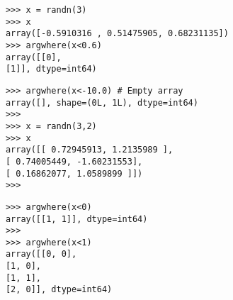 \documentclass[KSmainSlides.tex]{subfiles}
\begin{document}
				\begin{frame}[fragile]
		\begin{framed}
			\begin{verbatim}
			>>> x = randn(3)
			>>> x
			array([-0.5910316 , 0.51475905, 0.68231135])
			>>> argwhere(x<0.6)
			array([[0],
			[1]], dtype=int64)
					\end{verbatim}
				\end{framed}
			\end{frame}
				\begin{frame}[fragile]
			\begin{framed}
				\begin{verbatim}
			>>> argwhere(x<-10.0) # Empty array
			array([], shape=(0L, 1L), dtype=int64)
			>>>
			>>> x = randn(3,2)
			>>> x
			array([[ 0.72945913, 1.2135989 ],
			[ 0.74005449, -1.60231553],
			[ 0.16862077, 1.0589899 ]])
			>>>
				\end{verbatim}
			\end{framed}
		\end{frame}
			\begin{frame}[fragile]
		\begin{framed}
				\begin{verbatim}
			>>> argwhere(x<0)
			array([[1, 1]], dtype=int64)
			>>>
			>>> argwhere(x<1)
			array([[0, 0],
			[1, 0],
			[1, 1],
			[2, 0]], dtype=int64)
			\end{verbatim}
		\end{framed}
		\end{frame}
	
\end{document}

